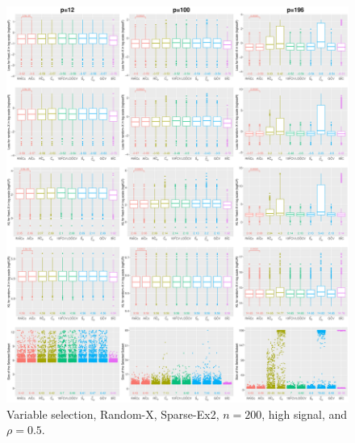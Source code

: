 \begin{figure}[!ht]
\centering
\includegraphics[width=\textwidth]{figures/supplement/randomx/subset_selection/Sparse-Ex2_n200_hsnr_rho05.eps}
\caption{Variable selection, Random-X, Sparse-Ex2, $n=200$, high signal, and $\rho=0.5$.}
\end{figure}
\clearpage
